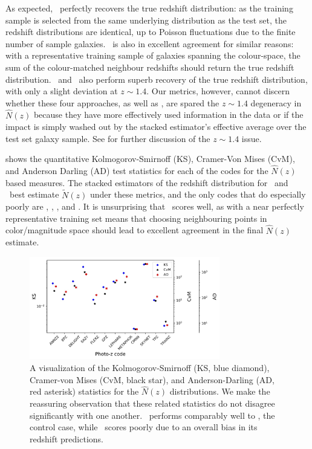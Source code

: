 As expected, \trainz\ perfectly recovers the true redshift distribution: as the training sample is selected from the same underlying distribution as the test set, the redshift distributions are identical, up to Poisson fluctuations due to the finite number of sample galaxies.
\cmnn\ is also in excellent agreement for similar reasons: with a representative training sample of galaxies spanning the colour-space, the sum of the colour-matched neighbour redshifts should return the true redshift distribution.
\flexzboost\ and \tpz\ also perform superb recovery of the true redshift distribution, with only a slight deviation at $z \sim 1.4$.
Our metrics, however, cannot discern whether these four approaches, as well as \delight, are spared the $z \sim 1.4$ degeneracy in $\hat{N}(z)$ because they have more effectively used information in the data or if the impact is simply washed out by the stacked estimator's effective average over the test set galaxy sample.
See  for further discussion of the $z \sim 1.4$ issue.

 shows the quantitative Kolmogorov-Smirnoff (KS), Cramer-Von Mises (CvM), and Anderson Darling (AD) test statistics for each of the codes for the $\hat{N}(z)$ based measures.
The stacked estimators of the redshift distribution for \cmnn\ and \trainz\ best estimate $\tilde{N}(z)$ under these metrics, and the only codes that do especially poorly are \eazy, \lephare, \metaphor, and \skynet.
It is unsurprising that \cmnn\ scores well, as with a near perfectly representative training set means that choosing neighbouring points in color/magnitude space should lead to excellent agreement in the final $\hat{N}(z)$ estimate.

\begin{figure}
	\centering
	\includegraphics[width=0.74\textwidth]{figures/pzdc1/KSvsCvMvsAD_NZ_withnull_jpg.jpg}
	\caption{A visualization of the Kolmogorov-Smirnoff (KS, blue diamond), Cramer-von Mises (CvM, black star), and Anderson-Darling (AD, red asterisk) statistics for the $\hat{N}(z)$ distributions.
		We make the reassuring observation that these related statistics do not disagree significantly with one another.
		\cmnn\ performs comparably well to \trainz, the control case, while \skynet\ scores poorly due to an overall bias in its redshift predictions.}
\end{figure}

